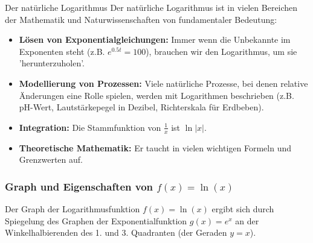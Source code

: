 \begin{warumwichtigumgebung}{Der natürliche Logarithmus}
Der natürliche Logarithmus ist in vielen Bereichen der Mathematik und Naturwissenschaften von fundamentaler Bedeutung:
\begin{itemize}
    \item \textbf{Lösen von Exponentialgleichungen:} Immer wenn die Unbekannte im Exponenten steht (z.B. $e^{0.5t}=100$), brauchen wir den Logarithmus, um sie 'herunterzuholen'.
    \item \textbf{Modellierung von Prozessen:} Viele natürliche Prozesse, bei denen relative Änderungen eine Rolle spielen, werden mit Logarithmen beschrieben (z.B. pH-Wert, Lautstärkepegel in Dezibel, Richterskala für Erdbeben).
    \item \textbf{Integration:} Die Stammfunktion von $\frac{1}{x}$ ist $\ln|x|$.
    \item \textbf{Theoretische Mathematik:} Er taucht in vielen wichtigen Formeln und Grenzwerten auf.
\end{itemize}
\end{warumwichtigumgebung}

\subsubsection{Graph und Eigenschaften von \texorpdfstring{$f(x)=\ln(x)$}{f(x)=ln(x)}}
Der Graph der Logarithmusfunktion $f(x)=\ln(x)$ ergibt sich durch Spiegelung des Graphen der Exponentialfunktion $g(x)=e^x$ an der Winkelhalbierenden des 1. und 3. Quadranten (der Geraden $y=x$).

